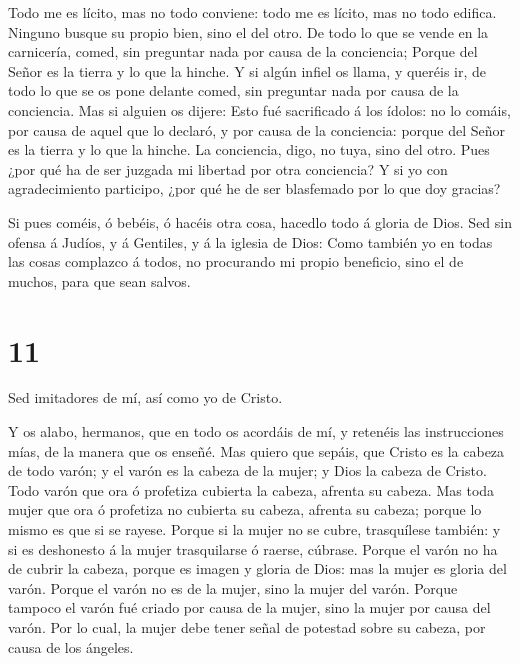  Todo me es lícito, mas no todo conviene: todo me es
lícito, mas no todo edifica.  Ninguno busque su propio
bien, sino el del otro.  De todo lo que se vende en la
carnicería, comed, sin preguntar nada por causa de la conciencia;
 Porque del Señor es la tierra y lo que la hinche.
 Y si algún infiel os llama, y queréis ir, de todo lo que
se os pone delante comed, sin preguntar nada por causa de la conciencia.
 Mas si alguien os dijere: Esto fué sacrificado á los
ídolos: no lo comáis, por causa de aquel que lo declaró, y por causa de
la conciencia: porque del Señor es la tierra y lo que la hinche.
 La conciencia, digo, no tuya, sino del otro. Pues ¿por qué
ha de ser juzgada mi libertad por otra conciencia?  Y si yo
con agradecimiento participo, ¿por qué he de ser blasfemado por lo que
doy gracias?

 Si pues coméis, ó bebéis, ó hacéis otra cosa, hacedlo todo
á gloria de Dios.  Sed sin ofensa á Judíos, y á Gentiles, y
á la iglesia de Dios:  Como también yo en todas las cosas
complazco á todos, no procurando mi propio beneficio, sino el de muchos,
para que sean salvos.

\hypertarget{section-10}{%
\section{11}\label{section-10}}

 Sed imitadores de mí, así como yo de Cristo.

 Y os alabo, hermanos, que en todo os acordáis de mí, y
retenéis las instrucciones mías, de la manera que os enseñé.
 Mas quiero que sepáis, que Cristo es la cabeza de todo
varón; y el varón es la cabeza de la mujer; y Dios la cabeza de Cristo.
 Todo varón que ora ó profetiza cubierta la cabeza, afrenta
su cabeza.  Mas toda mujer que ora ó profetiza no cubierta
su cabeza, afrenta su cabeza; porque lo mismo es que si se rayese.
 Porque si la mujer no se cubre, trasquílese también: y si
es deshonesto á la mujer trasquilarse ó raerse, cúbrase. 
Porque el varón no ha de cubrir la cabeza, porque es imagen y gloria de
Dios: mas la mujer es gloria del varón.  Porque el varón no
es de la mujer, sino la mujer del varón.  Porque tampoco el
varón fué criado por causa de la mujer, sino la mujer por causa del
varón.  Por lo cual, la mujer debe tener señal de potestad
sobre su cabeza, por causa de los ángeles.

